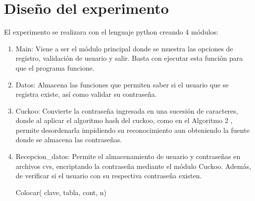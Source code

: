 \documentclass[final,a4paper,twocolumn,romanappendices]{IEEEtran}
\begin{document}
\section{Diseño del experimento}
El experimento se realizara con el lenguaje python creando 4 módulos:
\begin{enumerate}
    \item Main: Viene a ser el módulo principal donde se muestra las opciones de registro, validación de usuario y salir. Basta con ejecutar esta función para que el programa funcione.
    \item Datos: Almacena las funciones que permiten saber si el usuario que se registra existe, así como validar su contraseña.
    \item Cuckoo: Convierte la contraseña ingresada en una sucesión de caracteres, donde al aplicar el algoritmo hash del cuckoo, como en el Algoritmo 2 , permite desordenarla impidiendo su reconocimiento aun obteniendo la fuente donde se almacena las contraseñas.\\
     \item Recepcion\_datos: Permite el almacenamiento de usuario y contraseñas en archivos cvs, encriptando la contraseña mediante el módulo Cuckoo. Además, de verificar si el usuario con su respectiva contraseña existen.\\

    
    \begin{algorithm}[H]
\caption{ funcion{\textunderscore}hash(funcion,clave) \label{ALG1_1}}
        
 	
    	}	
\end{algorithm}
    
\begin{algorithm}[H]
	\caption{ Colocar( clave, tabla, cont, n)\label{ALG1_1}}
\end{algorithm}

\end{enumerate}
\end{document}
